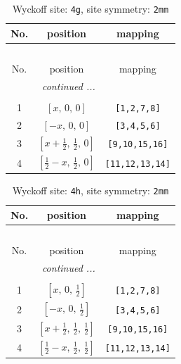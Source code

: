 \documentclass[fleqn,8pt]{jsarticle}
\begin{document}
\renewcommand{\arraystretch}{1.2}
\begin{longtable}{ccc}
\caption{Wyckoff site: {\tt 4g}, site symmetry: {\tt 2mm}}
 \\
 \hline \hline
No. & position & mapping \\ \hline \endfirsthead

\multicolumn{2}{l}{\tablename\ \thetable{}} \\
 \hline \hline
No. & position & mapping \\ \hline \endhead

 \hline \hline
\multicolumn{2}{r}{\footnotesize\it continued ...} \\ \endfoot

 \hline \hline
\multicolumn{2}{r}{} \\ \endlastfoot

1 & $\left[ x,\, 0,\, 0 \right]$ & {\tt [1,2,7,8]} \\ \hline
2 & $\left[ - x,\, 0,\, 0 \right]$ & {\tt [3,4,5,6]} \\ \hline
3 & $\left[ x + \frac{1}{2},\, \frac{1}{2},\, 0 \right]$ & {\tt [9,10,15,16]} \\ \hline
4 & $\left[ \frac{1}{2} - x,\, \frac{1}{2},\, 0 \right]$ & {\tt [11,12,13,14]} \\
\end{longtable}
\renewcommand{\arraystretch}{1.2}
\begin{longtable}{ccc}
\caption{Wyckoff site: {\tt 4h}, site symmetry: {\tt 2mm}}
 \\
 \hline \hline
No. & position & mapping \\ \hline \endfirsthead

\multicolumn{2}{l}{\tablename\ \thetable{}} \\
 \hline \hline
No. & position & mapping \\ \hline \endhead

 \hline \hline
\multicolumn{2}{r}{\footnotesize\it continued ...} \\ \endfoot

 \hline \hline
\multicolumn{2}{r}{} \\ \endlastfoot

1 & $\left[ x,\, 0,\, \frac{1}{2} \right]$ & {\tt [1,2,7,8]} \\ \hline
2 & $\left[ - x,\, 0,\, \frac{1}{2} \right]$ & {\tt [3,4,5,6]} \\ \hline
3 & $\left[ x + \frac{1}{2},\, \frac{1}{2},\, \frac{1}{2} \right]$ & {\tt [9,10,15,16]} \\ \hline
4 & $\left[ \frac{1}{2} - x,\, \frac{1}{2},\, \frac{1}{2} \right]$ & {\tt [11,12,13,14]} \\
\end{longtable}
\end{document}
